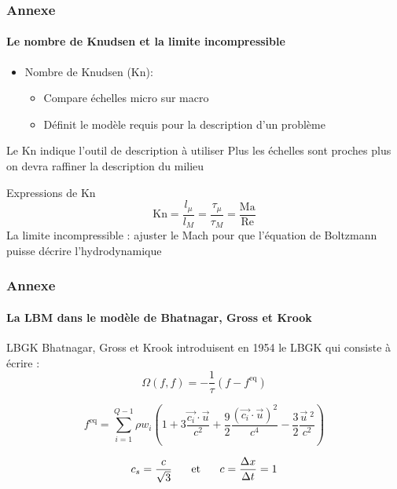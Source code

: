\documentclass[12pt, xcolor=svgnames]{beamer}
\newcommand{\BeGK}{Bhatnagar, Gross et Krook}
\newcommand{\bwarrow}{\item[\color{DarkRed} \ding{227}]}
\newcommand{\warrow}{\item[\color{blue!50!black!70} \tiny{\ding{109}}]}
\newcommand{\bepar}[1]{
	\left( #1 \right)  
}
\begin{document}
\appendix


\begin{frame}[noframenumbering]
\frametitle{Annexe}
\framesubtitle{Le nombre de Knudsen et la limite incompressible}
\begin{itemize}
	\bwarrow Nombre de Knudsen (Kn):
	\begin{itemize}
		\warrow Compare échelles micro sur macro
		\warrow Définit le modèle requis pour la description d'un problème 
	\end{itemize}
\end{itemize}
\begin{exampleblock}{Le Kn indique l'outil de description à utiliser}
Plus les échelles sont proches plus on devra raffiner la description du milieu
\end{exampleblock}
\begin{block}{Expressions de Kn}
\begin{equation*}
\text{Kn} = \frac{l_\mu}{l_M} = \frac{\tau_\mu}{\tau_M} = \frac{\text{Ma}}{\text{Re}}
\end{equation*}
La limite incompressible : ajuster le Mach pour que l'équation de Boltzmann puisse décrire l'hydrodynamique
\end{block}
\end{frame}

\begin{frame}[noframenumbering]
\frametitle{Annexe}
\framesubtitle{La LBM dans le modèle de \BeGK}
\begin{block}{LBGK}
	 \BeGK $ $ introduisent en 1954 le LBGK qui consiste à écrire : \\
	\begin{equation*}
	\Omega(f, f) = -\dfrac{1}{\tau} \bepar{f-f^{\text{eq}}}
	\end{equation*}

	\begin{equation*}
	 f^{\text{eq}} = \sum_{i=1}^{Q-1}\rho w_i \left(1 + 3 \frac{\vec{c_i}\cdot \vec{u}}{c^2} +  \frac{9}{2}\frac{\left( \vec{c_i} \cdot \vec{u} \right )^ 2}{c^4} - \frac{3}{2}\frac{\vec{u}\ ^2}{c^2}\right)
	\end{equation*}

	\begin{equation*}
	c_s = \dfrac{c}{\sqrt{3}} \text{\hspace{5mm} et \hspace{5mm}} c = \dfrac{\Delta x}{\Delta t} = 1
	\end{equation*}	

\end{block}
\end{frame}
\end{document}
